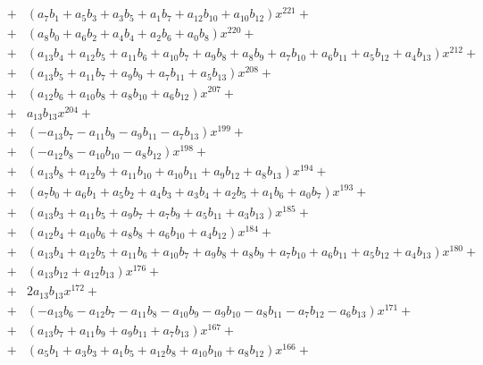 \documentclass{article}
\begin{document}
\begin{eqnarray*}
&+&   \left(a_{7} b_{1} + a_{5} b_{3} + a_{3} b_{5} + a_{1} b_{7} + a_{12} b_{10} + a_{10} b_{12}\right) x^{221}  + \\
&+&   \left(a_{8} b_{0} + a_{6} b_{2} + a_{4} b_{4} + a_{2} b_{6} + a_{0} b_{8}\right) x^{220}  + \\
&+&   \left(a_{13} b_{4} + a_{12} b_{5} + a_{11} b_{6} + a_{10} b_{7} + a_{9} b_{8} + a_{8} b_{9} + a_{7} b_{10} + a_{6} b_{11} + a_{5} b_{12} + a_{4} b_{13}\right) x^{212}  + \\
&+&   \left(a_{13} b_{5} + a_{11} b_{7} + a_{9} b_{9} + a_{7} b_{11} + a_{5} b_{13}\right) x^{208}  + \\
&+&   \left(a_{12} b_{6} + a_{10} b_{8} + a_{8} b_{10} + a_{6} b_{12}\right) x^{207}  + \\
&+&   a_{13} b_{13} x^{204}  + \\
&+&   \left(- a_{13} b_{7} -  a_{11} b_{9} -  a_{9} b_{11} -  a_{7} b_{13}\right) x^{199}  + \\
&+&   \left(- a_{12} b_{8} -  a_{10} b_{10} -  a_{8} b_{12}\right) x^{198}  + \\
&+&   \left(a_{13} b_{8} + a_{12} b_{9} + a_{11} b_{10} + a_{10} b_{11} + a_{9} b_{12} + a_{8} b_{13}\right) x^{194}  + \\
&+&   \left(a_{7} b_{0} + a_{6} b_{1} + a_{5} b_{2} + a_{4} b_{3} + a_{3} b_{4} + a_{2} b_{5} + a_{1} b_{6} + a_{0} b_{7}\right) x^{193}  + \\
&+&   \left(a_{13} b_{3} + a_{11} b_{5} + a_{9} b_{7} + a_{7} b_{9} + a_{5} b_{11} + a_{3} b_{13}\right) x^{185}  + \\
&+&   \left(a_{12} b_{4} + a_{10} b_{6} + a_{8} b_{8} + a_{6} b_{10} + a_{4} b_{12}\right) x^{184}  + \\
&+&   \left(a_{13} b_{4} + a_{12} b_{5} + a_{11} b_{6} + a_{10} b_{7} + a_{9} b_{8} + a_{8} b_{9} + a_{7} b_{10} + a_{6} b_{11} + a_{5} b_{12} + a_{4} b_{13}\right) x^{180}  + \\
&+&   \left(a_{13} b_{12} + a_{12} b_{13}\right) x^{176}  + \\
&+&   2 a_{13} b_{13} x^{172}  + \\
&+&   \left(- a_{13} b_{6} -  a_{12} b_{7} -  a_{11} b_{8} -  a_{10} b_{9} -  a_{9} b_{10} -  a_{8} b_{11} -  a_{7} b_{12} -  a_{6} b_{13}\right) x^{171}  + \\
&+&   \left(a_{13} b_{7} + a_{11} b_{9} + a_{9} b_{11} + a_{7} b_{13}\right) x^{167}  + \\
&+&   \left(a_{5} b_{1} + a_{3} b_{3} + a_{1} b_{5} + a_{12} b_{8} + a_{10} b_{10} + a_{8} b_{12}\right) x^{166}  + \\

\end{eqnarray*}
\end{document}
